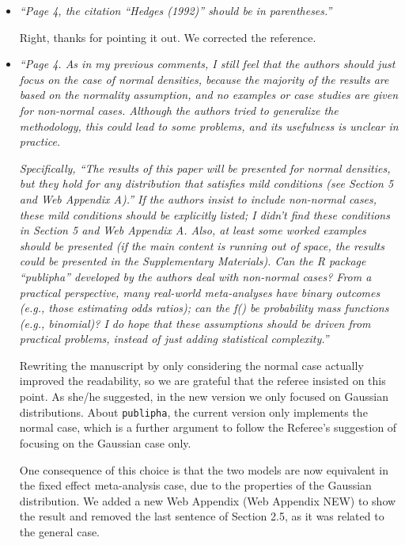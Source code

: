 \documentclass[11pt]{article}
\begin{document}
\begin{itemize}
\item \emph{``Page 4, the citation “Hedges (1992)” should be in parentheses.''}

Right, thanks for pointing it out. We corrected the reference.\\

\item \emph{``Page 4. As in my previous comments, I still feel that the authors should just focus on the case of normal densities, because the majority of the results are based on the normality assumption, and no examples or case studies are given for non-normal cases. Although the authors tried to generalize the methodology, this could lead to some problems, and its usefulness is unclear in practice.}

\emph{Specifically, ``The results of this paper will be presented for normal densities, but they hold for any distribution that satisfies mild conditions (see Section 5 and Web Appendix A).'' If the authors insist to include non-normal cases, these mild conditions should be explicitly listed; I didn't find these conditions in Section 5 and Web Appendix A. Also, at least some worked examples should be presented (if the main content is running out of space, the results could be presented in the Supplementary Materials). Can the R package ``publipha'' developed by the authors deal with non-normal cases? From a practical perspective, many real-world meta-analyses have binary outcomes (e.g., those estimating odds ratios); can the f() be probability mass functions (e.g., binomial)? I do hope that these assumptions should be driven from practical problems, instead of just adding statistical complexity.''}

Rewriting the manuscript by only considering the normal case actually improved the readability, so we are grateful that the referee insisted on this point. As she/he suggested, in the new version we only focused on Gaussian distributions. About \texttt{publipha}, the current version only implements the normal case, which is a further argument to follow the Referee's suggestion of focusing on the Gaussian case only.

One consequence of this choice is that the two models are now equivalent in the fixed effect meta-analysis case, due to the properties of the Gaussian distribution. We added a new Web Appendix (Web Appendix NEW) to show the result and removed the last sentence of Section 2.5, as it was related to the general case.\\


\end{itemize}
\end{document}
